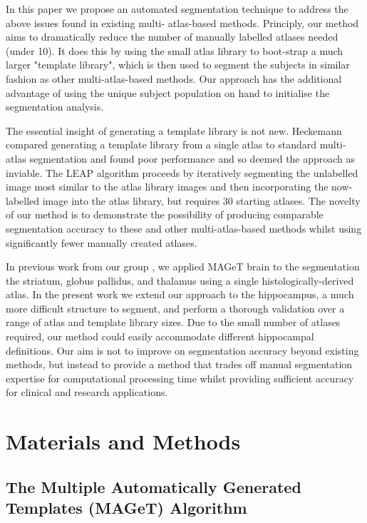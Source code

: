 \documentclass{article}\usepackage{graphicx, color}
\begin{document}
In this paper we propose an automated segmentation technique to address the
above issues found in existing multi- atlas-based methods. Principly, our
method aims to dramatically reduce the number of manually labelled atlases
needed (under 10). It does this by using the small atlas library to boot-strap
a much larger "template library", which is then used to segment the subjects in
similar fashion as other multi-atlas-based methods. Our approach has the
additional advantage of using the unique subject population on hand to
initialise the segmentation analysis.

The essential insight of generating a template library is not new.  Heckemann
\cite{Heckemann2006} compared generating a template library from a single atlas
to standard multi-atlas segmentation and found poor performance and so deemed
the approach as inviable.  The LEAP algorithm \cite{Wolz2010} proceeds by
iteratively segmenting the unlabelled image most similar to the atlas library
images and then incorporating the now-labelled image into the atlas library,
but requires 30 starting atlases.  The novelty of our method is to demonstrate
the possibility of producing comparable segmentation accuracy to these and
other multi-atlas-based methods whilst using significantly fewer manually
created atlases.

In previous work from our group \cite{Chakravarty2012}, we applied MAGeT brain
to the segmentation the striatum, globus pallidus, and thalamus using a single
histologically-derived atlas. In the present work we extend our approach to the
hippocampus, a much more difficult structure to segment, and perform a thorough
validation over a range of atlas and template library sizes. Due to the small
number of atlases required, our method could easily accommodate different
hippocampal definitions. Our aim is not to improve on segmentation accuracy
beyond existing methods, but instead to provide a method that trades off manual
segmentation expertise for computational processing time whilst providing
sufficient accuracy for clinical and research applications.


\section{Materials and Methods} 
\subsection{The Multiple Automatically Generated Templates (MAGeT) Algorithm}
\end{document}
